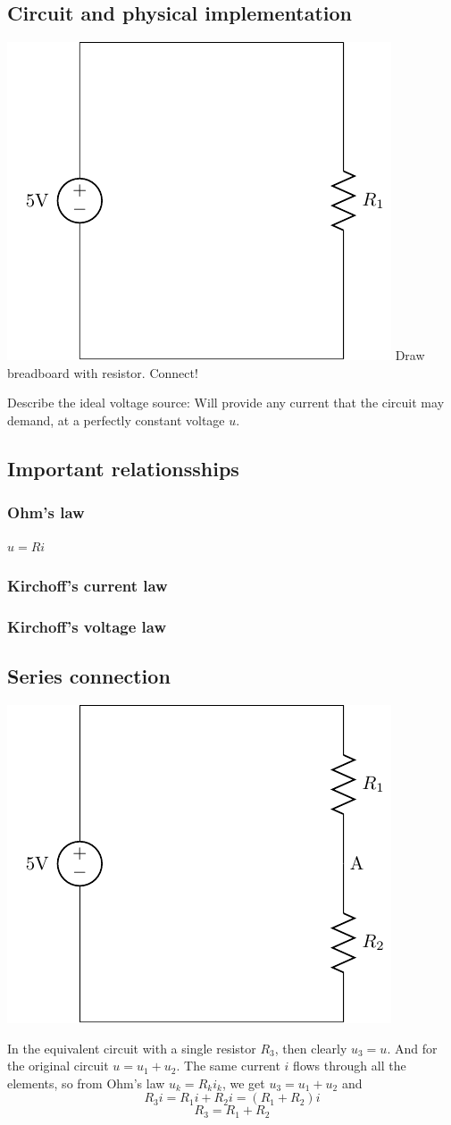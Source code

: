 \documentclass[a4paper]{scrartcl}
\begin{document}
\subsection{Circuit and physical implementation}
\label{sec-6-3}

\begin{center}
\includegraphics[width=0.4\linewidth]{../../figures/R-circuit}
Draw breadboard with resistor. Connect!
\end{center}

Describe the ideal voltage source: Will provide any current that the circuit may demand, at a perfectly constant voltage $u$. 

\subsection{Important relationsships}
\label{sec-6-4}

\subsubsection{Ohm's law}
\label{sec-6-4-1}
\(u = Ri\)

\subsubsection{Kirchoff's current law}
\label{sec-6-4-2}

\subsubsection{Kirchoff's voltage law}
\label{sec-6-4-3}

\subsection{Series connection}
\label{sec-6-5}
\begin{center}
\includegraphics[width=0.4\linewidth]{../../figures/voltage-divider-circuit}
\end{center}
In the equivalent circuit with a single resistor $R_3$, then clearly $u_3=u$. And for the original circuit $u = u_1 + u_2$. The same current $i$ flows through all the elements, so from Ohm's law $u_k = R_k i_k$, we get
\( u_3 = u_1 + u_2\) and
\[ R_3 i = R_1 i + R_2 i = (R_1 + R_2) i \]
\[ R_3 = R_1 + R_2\]
\end{document}
